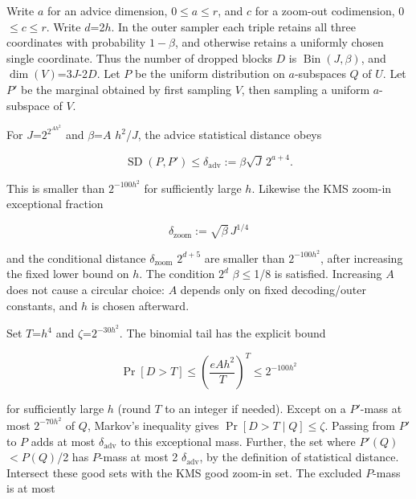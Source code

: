 Write \(a\) for an advice dimension, 0\(\le\)\(a\)\(\le\)\(r\), and \(c\) for a zoom-out codimension, 0\(\le\)\(c\)\(\le\)\(r\). Write \(d\)=2\(h\). In the outer sampler each triple retains all three coordinates with probability \(1-\beta\), and otherwise retains a uniformly chosen single coordinate. Thus the number of dropped blocks \(D\) is \(\operatorname{Bin}(J,\beta)\), and \(\dim(V)\)=3\(J\)-2\(D\). Let \(P\) be the uniform distribution on \(a\)-subspaces \(Q\) of \(U\). Let \(P'\) be the marginal obtained by first sampling \(V\), then sampling a uniform \(a\)-subspace of \(V\).

For \(J\)=\(2^{2^{A h^2}}\) and \(\beta\)=\(A\) \(h^2\)/\(J\), the advice statistical distance obeys

\begin{equation}\label{eq:7}
\operatorname{SD}(P,P')\le\delta_{\mathrm{adv}}:=\beta\sqrt J\,2^{a+4}.
\end{equation}

This is smaller than \(2^{-100h^2}\) for sufficiently large \(h\). Likewise the KMS zoom-in exceptional fraction

\begin{equation}\label{eq:8}
\delta_{\mathrm{zoom}}:=\sqrt\beta\,J^{1/4}
\end{equation}

and the conditional distance \(\delta_{\mathrm{zoom}}\) \(2^{d+5}\) are smaller than \(2^{-100h^2}\), after increasing the fixed lower bound on \(h\). The condition \(2^d\) \(\beta\)\(\le\)1/8 is satisfied. Increasing \(A\) does not cause a circular choice: \(A\) depends only on fixed decoding/outer constants, and \(h\) is chosen afterward.

Set \(T\)=\(h^4\) and \(\zeta\)=\(2^{-30h^2}\). The binomial tail has the explicit bound

\begin{equation}\label{eq:9}
\Pr[D>T]\le\left(\frac{eAh^2}{T}\right)^T\le2^{-100h^2}
\end{equation}

for sufficiently large \(h\) (round \(T\) to an integer if needed). Except on a \(P'\)-mass at most \(2^{-70h^2}\) of \(Q\), Markov's inequality gives \(\Pr[D>T\mid Q]\)\(\le\)\(\zeta\). Passing from \(P'\) to \(P\) adds at most \(\delta_{\mathrm{adv}}\) to this exceptional mass. Further, the set where \(P'(Q)\)\(<\)\(P(Q)\)/2 has \(P\)-mass at most 2 \(\delta_{\mathrm{adv}}\), by the definition of statistical distance. Intersect these good sets with the KMS good zoom-in set. The excluded \(P\)-mass is at most

